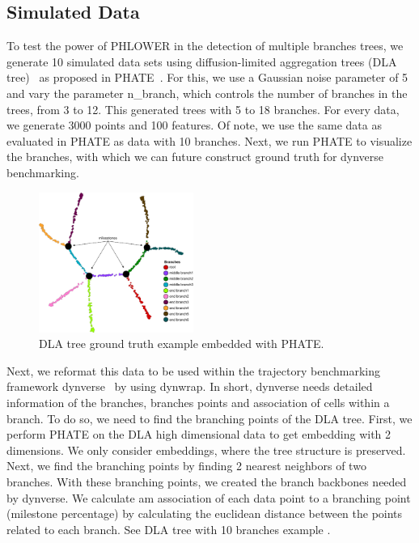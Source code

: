 \subsection{Simulated Data}
\label{PHLOWER_bench:sim}
To test the power of PHLOWER in the detection of multiple branches trees, we generate 10 simulated data sets using diffusion-limited aggregation trees (DLA tree)~\citep{witten1981diffusion} as proposed in PHATE~\citep{moon2017phate}. For this, we use a Gaussian noise parameter of 5 and vary the parameter n\_branch, which controls the number of branches in the trees, from 3 to 12. This generated trees with 5 to 18 branches.  For every data, we generate \num{3000} points and \num{100} features. Of note, we use the same data as evaluated in PHATE as data with 10 branches. Next, we run PHATE to visualize the branches, with which we can future construct ground truth for dynverse benchmarking.

\begin{figure}[!h]
	\centering
	\includegraphics[width=0.45\textwidth]{DLA_example/fig}
	\vspace{0.1cm}
	\caption[DLA tree ground truth example]{DLA tree ground truth example embedded with PHATE.}
	\label{fig:DLA_example}
\end{figure}


Next, we reformat this data to be used within the trajectory benchmarking framework dynverse~\citep{saelens2019comparison} by using dynwrap. In short, dynverse needs detailed information of the branches, branches points and association of cells within a branch.  To do so, we need to find the branching points of the DLA tree. First, we perform PHATE on the DLA high dimensional data to get embedding with 2 dimensions. We only consider embeddings, where the tree structure is preserved. Next, we find the branching points by finding 2 nearest neighbors of two branches. With these branching points, we created the branch backbones needed by dynverse. We calculate am association of each data point to a branching point (milestone percentage) by calculating the euclidean distance between the points related to each branch. See DLA tree with 10 branches example .

